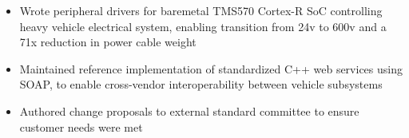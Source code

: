 \begin{itemize}
    \item Wrote peripheral drivers for baremetal TMS570 Cortex-R SoC controlling heavy vehicle electrical system, enabling transition from 24v to 600v and a 71x reduction in power cable weight
    \item Maintained reference implementation of standardized C++ web services using SOAP, to enable cross-vendor interoperability between vehicle subsystems
    \item Authored change proposals to external standard committee to ensure customer needs were met
\end{itemize}
